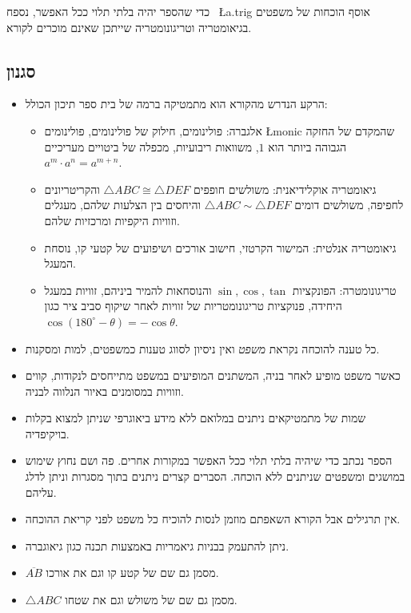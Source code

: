 
כדי שהספר יהיה בלתי תלוי ככל האפשר, נספח~%
\L{a.trig}
אוסף הוכחות של משפטים בגיאומטריה וטריגונומטריה שייתכן שאינם מוכרים לקורא.


\subsection*{סגנון}

\begin{itemize}
\item
הרקע הנדרש מהקורא הוא מתמטיקה ברמה של בית ספר תיכון הכולל:

\begin{itemize}
\item
אלגברה: פולינומים, חילוק של פולינומים, פולינומים 
\L{monic}
שהמקדם של החזקה הגבוהה ביותר הוא $1$, משוואות ריבועיות, מכפלה של ביטויים מעריכיים 
$a^m\cdot a^n=a^{m+n}$.

\item
גיאומטריה אוקלידיאנית: משולשים חופפים 
$\triangle ABC \cong \triangle DEF$
והקריטריונים לחפיפה, משולשים דומים
$\triangle ABC \sim \triangle DEF$
והיחסים בין הצלעות שלהם, מעגלים וזוויות היקפיות ומרכזיות שלהם.

\item
גיאומטריה אנלטית: המישור הקרטזי, חישוב אורכים ושיפועים של קטעי קו, נוסחת המעגל.

\item
טריגונומטרה: הפונקציות 
$\sin,\cos,\tan$
והנוסחאות להמיר ביניהם, זוויות במעגל היחידה, פנוקציות טריגונומטריות של זוויות לאחר שיקוף סביב ציר כגון
$\cos (180^\circ-\theta)=-\cos\theta$.
\end{itemize}

\item
כל טענה להוכחה נקראת 
\emph{משפט}
ואין ניסיון לסווג טענות כמשפטים, למות ומסקנות.

\item
כאשר משפט מופיע לאחר בניה, המשתנים המופיעים במשפט מתייחסים לנקודות, קווים וזוויות במסומנים באיור הנלווה לבניה.

\item
שמות של מתמטיקאים ניתנים במלואם ללא מידע ביאוגרפי שניתן למצוא בקלות בויקיפדיה.

\item
הספר נכתב כדי שיהיה בלתי תלוי ככל האפשר במקורות אחרים. פה ושם נחוץ שימוש במושגים ומשפטים שניתנים ללא הוכחה. הסברים קצרים ניתנים בתוך מסגרות וניתן לדלג עליהם.

\item
אין תרגילים אבל הקורא השאפתם מוזמן לנסות להוכיח כל משפט לפני קריאת ההוכחה.

\item
ניתן להתעמק בבניות גיאמריות באמצעות תכנה כגון גיאוגברה.

\item
$\overline{AB}$
מסמן גם שם של קטע קו וגם את אורכו.

\item
$\triangle ABC$
מסמן גם שם של משולש וגם את שטחו.
\end{itemize}

